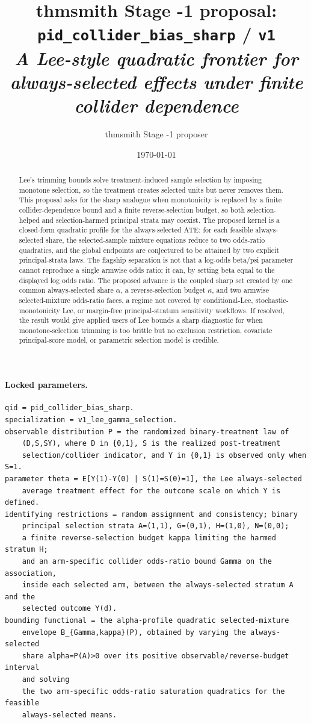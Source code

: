 \documentclass[11pt]{article}
\title{thmsmith Stage -1 proposal: \texttt{pid\_collider\_bias\_sharp} / \texttt{v1}%
  \\ \large\textit{A Lee-style quadratic frontier for always-selected effects under finite collider dependence}}
\author{thmsmith Stage -1 proposer}
\date{\today}
\theoremstyle{definition}
\theoremstyle{plain}
\theoremstyle{remark}
\begin{document}
\maketitle


\paragraph{Locked parameters.}
\begin{verbatim}
qid = pid_collider_bias_sharp.
specialization = v1_lee_gamma_selection.
observable distribution P = the randomized binary-treatment law of
    (D,S,SY), where D in {0,1}, S is the realized post-treatment
    selection/collider indicator, and Y in {0,1} is observed only when S=1.
parameter theta = E[Y(1)-Y(0) | S(1)=S(0)=1], the Lee always-selected
    average treatment effect for the outcome scale on which Y is defined.
identifying restrictions = random assignment and consistency; binary
    principal selection strata A=(1,1), G=(0,1), H=(1,0), N=(0,0);
    a finite reverse-selection budget kappa limiting the harmed stratum H;
    and an arm-specific collider odds-ratio bound Gamma on the association,
    inside each selected arm, between the always-selected stratum A and the
    selected outcome Y(d).
bounding functional = the alpha-profile quadratic selected-mixture
    envelope B_{Gamma,kappa}(P), obtained by varying the always-selected
    share alpha=P(A)>0 over its positive observable/reverse-budget interval
    and solving
    the two arm-specific odds-ratio saturation quadratics for the feasible
    always-selected means.
\end{verbatim}

\begin{abstract}
Lee's trimming bounds solve treatment-induced sample selection by imposing monotone selection, so the treatment creates selected units but never removes them.  This proposal asks for the sharp analogue when monotonicity is replaced by a finite collider-dependence bound and a finite reverse-selection budget, so both selection-helped and selection-harmed principal strata may coexist.  The proposed kernel is a closed-form quadratic profile for the always-selected ATE: for each feasible always-selected share, the selected-sample mixture equations reduce to two odds-ratio quadratics, and the global endpoints are conjectured to be attained by two explicit principal-strata laws.  The flagship separation is not that a log-odds beta/psi parameter cannot reproduce a single armwise odds ratio; it can, by setting beta equal to the displayed log odds ratio.  The proposed advance is the coupled sharp set created by one common always-selected share \(\alpha\), a reverse-selection budget \(\kappa\), and two armwise selected-mixture odds-ratio faces, a regime not covered by conditional-Lee, stochastic-monotonicity Lee, or margin-free principal-stratum sensitivity workflows.  If resolved, the result would give applied users of Lee bounds a sharp diagnostic for when monotone-selection trimming is too brittle but no exclusion restriction, covariate principal-score model, or parametric selection model is credible.
\end{abstract}
\end{document}
